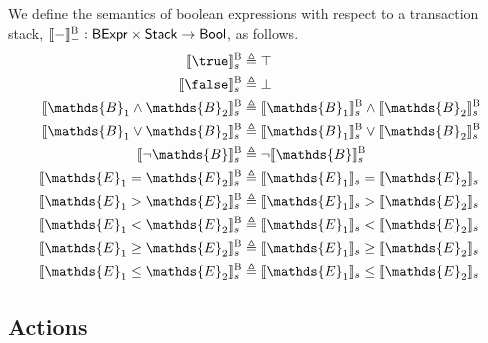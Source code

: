 We define the semantics of boolean expressions with respect to a transaction stack, $\llbracket - \rrbracket_-^\textsc{B} : \mathsf{BExpr} \times \mathsf{Stack} \rightarrow \mathsf{Bool}$, as follows.
\begin{align*}
\llbracket \true \rrbracket_s^\textsc{B} &\triangleq \top \\
\llbracket \false \rrbracket_s^\textsc{B} &\triangleq \bot \\
\llbracket \mathds{B}_1 \land \mathds{B}_2 \rrbracket_s^\textsc{B} &\triangleq \llbracket \mathds{B}_1 \rrbracket_s^\textsc{B} \land \llbracket \mathds{B}_2 \rrbracket_s^\textsc{B} \\
\llbracket \mathds{B}_1 \lor \mathds{B}_2 \rrbracket_s^\textsc{B} &\triangleq \llbracket \mathds{B}_1 \rrbracket_s^\textsc{B} \lor \llbracket \mathds{B}_2 \rrbracket_s^\textsc{B} \\
\llbracket \lnot \mathds{B} \rrbracket_s^\textsc{B} &\triangleq \lnot \llbracket \mathds{B} \rrbracket_s^\textsc{B} \\
\llbracket \mathds{E}_1 = \mathds{E}_2 \rrbracket_s^\textsc{B} &\triangleq \llbracket \mathds{E}_1 \rrbracket_s = \llbracket \mathds{E}_2 \rrbracket_s \\
\llbracket \mathds{E}_1 > \mathds{E}_2 \rrbracket_s^\textsc{B} &\triangleq \llbracket \mathds{E}_1 \rrbracket_s > \llbracket \mathds{E}_2 \rrbracket_s \\
\llbracket \mathds{E}_1 < \mathds{E}_2 \rrbracket_s^\textsc{B} &\triangleq \llbracket \mathds{E}_1 \rrbracket_s < \llbracket \mathds{E}_2 \rrbracket_s \\
\llbracket \mathds{E}_1 \geq \mathds{E}_2 \rrbracket_s^\textsc{B} &\triangleq \llbracket \mathds{E}_1 \rrbracket_s \geq \llbracket \mathds{E}_2 \rrbracket_s \\
\llbracket \mathds{E}_1 \leq \mathds{E}_2 \rrbracket_s^\textsc{B} &\triangleq \llbracket \mathds{E}_1 \rrbracket_s \leq \llbracket \mathds{E}_2 \rrbracket_s \\
\end{align*}

\subsection{Actions}

